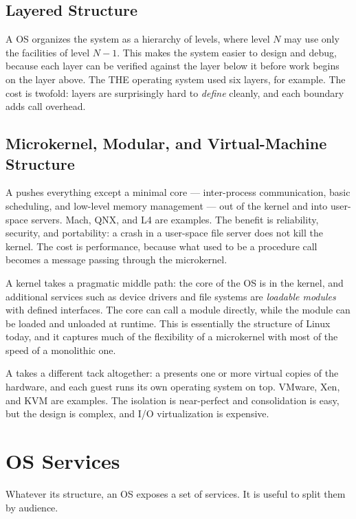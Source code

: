 \documentclass[11pt]{article}
\begin{document}
\subsection{Layered Structure}

A  OS organizes the system as a hierarchy of levels, where level $N$ may use only the facilities of level $N-1$. This makes the system easier to design and debug, because each layer can be verified against the layer below it before work begins on the layer above. The THE operating system used six layers, for example. The cost is twofold: layers are surprisingly hard to \emph{define} cleanly, and each boundary adds call overhead.

\subsection{Microkernel, Modular, and Virtual-Machine Structure}

A  pushes everything except a minimal core --- inter-process communication, basic scheduling, and low-level memory management --- out of the kernel and into user-space servers. Mach, QNX, and L4 are examples. The benefit is reliability, security, and portability: a crash in a user-space file server does not kill the kernel. The cost is performance, because what used to be a procedure call becomes a message passing through the microkernel.

A  kernel takes a pragmatic middle path: the core of the OS is in the kernel, and additional services such as device drivers and file systems are \emph{loadable modules} with defined interfaces. The core can call a module directly, while the module can be loaded and unloaded at runtime. This is essentially the structure of Linux today, and it captures much of the flexibility of a microkernel with most of the speed of a monolithic one.

A  takes a different tack altogether: a  presents one or more virtual copies of the hardware, and each guest runs its own operating system on top. VMware, Xen, and KVM are examples. The isolation is near-perfect and consolidation is easy, but the design is complex, and I/O virtualization is expensive.

\section{OS Services}

Whatever its structure, an OS exposes a set of services. It is useful to split them by audience.
\end{document}
